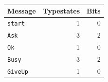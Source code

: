 \begin{tabular}{@{}lrr@{}}
\toprule
Message & Typestates & Bits \\
\midrule
\texttt{start} & 1 & 0 \\
\texttt{Ask} & 3 & 2 \\
\texttt{Ok} & 1 & 0 \\
\texttt{Busy} & 3 & 2 \\
\texttt{GiveUp} & 1 & 0 \\
\bottomrule
\end{tabular}
